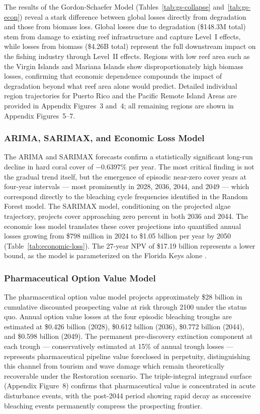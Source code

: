 \documentclass[10pt,letterpaper]{article}
\newcounter{gs}
\begin{document}
The results of the Gordon-Schaefer Model (Tables~\ref{tab:gs-collapse} and~\ref{tab:gs-econ}) reveal a stark difference between global losses directly from degradation and those from biomass loss. Global losses due to degradation (\$148.3M total) stem from damage to existing reef infrastructure and capture Level~I effects, while losses from biomass (\$4.26B total) represent the full downstream impact on the fishing industry through Level~II effects. Regions with low reef area such as the Virgin Islands and Mariana Islands show disproportionately high biomass losses, confirming that economic dependence compounds the impact of degradation beyond what reef area alone would predict. Detailed individual region trajectories for Puerto Rico and the Pacific Remote Island Areas are provided in Appendix Figures~3 and~4; all remaining regions are shown in Appendix Figures~5--7.

\subsubsection{ARIMA, SARIMAX, and Economic Loss Model}

The ARIMA and SARIMAX forecasts confirm a statistically significant long-run decline in hard coral cover of $-0.6397\%$ per year. The most critical finding is not the gradual trend itself, but the emergence of episodic near-zero cover years at four-year intervals --- most prominently in 2028, 2036, 2044, and 2049 --- which correspond directly to the bleaching cycle frequencies identified in the Random Forest model. The SARIMAX model, conditioning on the projected algae trajectory, projects cover approaching zero percent in both 2036 and 2044. The economic loss model translates these cover projections into quantified annual losses growing from \$798 million in 2024 to \$1.05 billion per year by 2050 (Table~\ref{tab:economic-loss}). The 27-year NPV of \$17.19 billion represents a lower bound, as the model is parameterized on the Florida Keys alone \cite{cesar_beukering_2004, spalding_tourism_2017}.

\subsubsection{Pharmaceutical Option Value Model}

The pharmaceutical option value model projects approximately \$28 billion in cumulative discounted prospecting value at risk through 2100 under the status quo. Annual option value losses at the four episodic bleaching troughs are estimated at \$0.426 billion (2028), \$0.612 billion (2036), \$0.772 billion (2044), and \$0.598 billion (2049). The permanent pre-discovery extinction component at each trough --- conservatively estimated at 15\% of annual trough losses --- represents pharmaceutical pipeline value foreclosed in perpetuity, distinguishing this channel from tourism and wave damage which remain theoretically recoverable under the Restoration scenario. The triple-integral integrand surface (Appendix Figure~8) confirms that pharmaceutical value is concentrated in acute disturbance events, with the post-2044 period showing rapid decay as successive bleaching events permanently compress the prospecting frontier.
\end{document}
